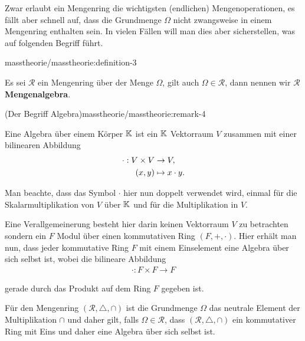 \par
Zwar erlaubt ein Mengenring die wichtigsten (endlichen) Mengenoperationen, es fällt aber schnell auf, dass die Grundmenge \(\Omega\) nicht zwangsweise in einem Mengenring enthalten sein. In vielen Fällen will man dies aber sicherstellen, was auf folgenden Begriff führt.
\begin{definition}{}{masstheorie/masstheorie:definition-3}



\par
Es sei \(\mathcal{R}\) ein Mengenring über der Menge \(\Omega\), gilt auch \(\Omega\in\mathcal{R}\), dann nennen wir \(\mathcal{R}\) \textbf{Mengenalgebra}.
\end{definition}
\begin{remark}{(Der Begriff Algebra)}{masstheorie/masstheorie:remark-4}



\par
Eine Algebra über einem Körper \(\mathbb{K}\) ist ein \(\mathbb{K}\) Vektorraum \(V\) zusammen mit einer bilinearen Abbildung
\begin{align*}
\cdot:V\times V&\to V,\\
(x,y)&\mapsto x\cdot y.
\end{align*}
\par
Man beachte, dass das Symbol \(\cdot\) hier nun doppelt verwendet wird, einmal für die Skalarmultiplikation von \(V\) über \(\mathbb{K}\) und für die Multiplikation in \(V\).

\par
Eine Verallgemeinerung besteht hier darin keinen Vektorraum \(V\) zu betrachten sondern ein \(F\) Modul über einen kommutativen Ring \((F,+,\cdot)\). Hier erhält man nun, dass jeder kommutative Ring \(F\) mit einem Einselement eine Algebra über sich selbst ist, wobei die bilineare Abbildung
\begin{align*}
\cdot:F\times F\to F
\end{align*}
\par
gerade durch das Produkt auf dem Ring \(F\) gegeben ist.

\par
Für den Mengenring \((\mathcal{R},\triangle, \cap)\) ist die Grundmenge \(\Omega\) das neutrale Element der Multiplikation \(\cap\) und daher gilt, falls \(\Omega\in\mathcal{R}\), dass \((\mathcal{R},\triangle, \cap)\) ein kommutativer Ring mit Eins und daher eine Algebra über sich selbst ist.
\end{remark}

